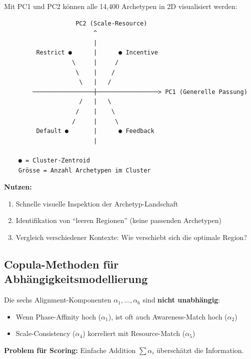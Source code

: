 \begin{tcolorbox}[colback=yellow!5!white, colframe=yellow!75!black,
    title=\textbf{Visualisierung: 2D-Projektion der Archetypen}]

Mit PC1 und PC2 können alle 14,400 Archetypen in 2D visualisiert werden:

\begin{verbatim}
                    PC2 (Scale-Resource)
                         ^
                         |
         Restrict ●      |      ● Incentive
                   \     |     /
                    \    |    /
                     \   |   /
        ─────────────────┼─────────────────> PC1 (Generelle Passung)
                     /   |   \
                    /    |    \
                   /     |     \
         Default ●       |      ● Feedback
                         |

    ● = Cluster-Zentroid
    Grösse = Anzahl Archetypen im Cluster
\end{verbatim}

\textbf{Nutzen:}
\begin{enumerate}[nosep]
    \item Schnelle visuelle Inspektion der Archetyp-Landschaft
    \item Identifikation von ``leeren Regionen'' (keine passenden Archetypen)
    \item Vergleich verschiedener Kontexte: Wie verschiebt sich die optimale Region?
\end{enumerate}

\end{tcolorbox}

\subsection{Copula-Methoden für Abhängigkeitsmodellierung}

\begin{tcolorbox}[colback=gray!5!white, colframe=gray!75!black,
    title=\textbf{Problem: Korrelierte Alignment-Komponenten}]

Die sechs Alignment-Komponenten $\alpha_1, ..., \alpha_6$ sind \textbf{nicht unabhängig}:

\begin{itemize}[nosep]
    \item Wenn Phase-Affinity hoch ($\alpha_1$), ist oft auch Awareness-Match hoch ($\alpha_2$)
    \item Scale-Consistency ($\alpha_4$) korreliert mit Resource-Match ($\alpha_5$)
\end{itemize}

\textbf{Problem für Scoring:} Einfache Addition $\sum \alpha_i$ überschätzt die Information.

\end{tcolorbox}

